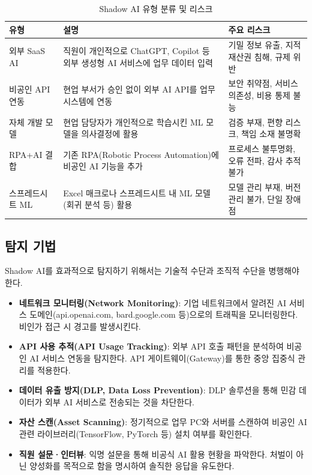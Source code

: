 \begin{table}[htbp]
\centering
\caption{Shadow AI 유형 분류 및 리스크}
\label{tab:shadow_ai_types}
\begin{tabularx}{\textwidth}{p{2.5cm}Xp{4cm}}
\toprule
\textbf{유형} & \textbf{설명} & \textbf{주요 리스크} \\
\midrule
외부 SaaS AI & 직원이 개인적으로 ChatGPT, Copilot 등 외부 생성형 AI 서비스에 업무 데이터 입력 & 기밀 정보 유출, 지적재산권 침해, 규제 위반 \\
\midrule
비공인 API 연동 & 현업 부서가 승인 없이 외부 AI API를 업무 시스템에 연동 & 보안 취약점, 서비스 의존성, 비용 통제 불능 \\
\midrule
자체 개발 모델 & 현업 담당자가 개인적으로 학습시킨 ML 모델을 의사결정에 활용 & 검증 부재, 편향 리스크, 책임 소재 불명확 \\
\midrule
RPA+AI 결합 & 기존 RPA(Robotic Process Automation)에 비공인 AI 기능을 추가 & 프로세스 불투명화, 오류 전파, 감사 추적 불가 \\
\midrule
스프레드시트 ML & Excel 매크로나 스프레드시트 내 ML 모델(회귀 분석 등) 활용 & 모델 관리 부재, 버전 관리 불가, 단일 장애점 \\
\bottomrule
\end{tabularx}
\end{table}

\subsection{탐지 기법}
\label{sec:8.7.2}

Shadow AI를 효과적으로 탐지하기 위해서는 기술적 수단과 조직적 수단을 병행해야 한다.

\begin{itemize}
    \item \textbf{네트워크 모니터링(Network Monitoring)}: 기업 네트워크에서 알려진 AI 서비스 도메인(api.openai.com, bard.google.com 등)으로의 트래픽을 모니터링한다. 비인가 접근 시 경고를 발생시킨다.
    \item \textbf{API 사용 추적(API Usage Tracking)}: 외부 API 호출 패턴을 분석하여 비공인 AI 서비스 연동을 탐지한다. API 게이트웨이(Gateway)를 통한 중앙 집중식 관리를 적용한다.
    \item \textbf{데이터 유출 방지(DLP, Data Loss Prevention)}: DLP 솔루션을 통해 민감 데이터가 외부 AI 서비스로 전송되는 것을 차단한다.
    \item \textbf{자산 스캔(Asset Scanning)}: 정기적으로 업무 PC와 서버를 스캔하여 비공인 AI 관련 라이브러리(TensorFlow, PyTorch 등) 설치 여부를 확인한다.
    \item \textbf{직원 설문·인터뷰}: 익명 설문을 통해 비공식 AI 활용 현황을 파악한다. 처벌이 아닌 양성화를 목적으로 함을 명시하여 솔직한 응답을 유도한다.
\end{itemize}

